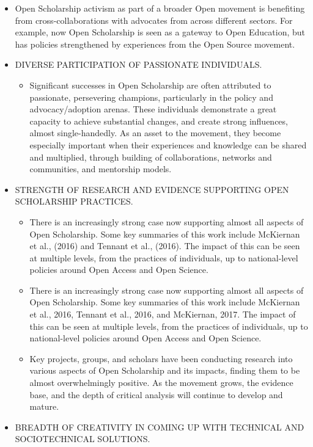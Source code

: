 \documentclass[]{article}
\providecommand{\tightlist}{%
  \setlength{\itemsep}{0pt}\setlength{\parskip}{0pt}}
\begin{document}
\begin{itemize}
\item
  Open Scholarship activism as part of a broader Open movement is
  benefiting from cross-collaborations with advocates from across
  different sectors. For example, now Open Scholarship is seen as a
  gateway to Open Education, but has policies strengthened by
  experiences from the Open Source movement.
\item
  DIVERSE PARTICIPATION OF PASSIONATE INDIVIDUALS.

  \begin{itemize}
  \tightlist
  \item
    Significant successes in Open Scholarship are often attributed to
    passionate, persevering champions, particularly in the policy and
    advocacy/adoption arenas. These individuals demonstrate a great
    capacity to achieve substantial changes, and create strong
    influences, almost single-handedly. As an asset to the movement,
    they become especially important when their experiences and
    knowledge can be shared and multiplied, through building of
    collaborations, networks and communities, and mentorship models.
  \end{itemize}
\item
  STRENGTH OF RESEARCH AND EVIDENCE SUPPORTING OPEN SCHOLARSHIP
  PRACTICES.

  \begin{itemize}
  \item
    There is an increasingly strong case now supporting almost all
    aspects of Open Scholarship. Some key summaries of this work include
    McKiernan et al., (2016) and Tennant et al., (2016). The impact of
    this can be seen at multiple levels, from the practices of
    individuals, up to national-level policies around Open Access and
    Open Science.
  \item
    There is an increasingly strong case now supporting almost all
    aspects of Open Scholarship. Some key summaries of this work include
    McKiernan et al., 2016, Tennant et al., 2016, and McKiernan, 2017.
    The impact of this can be seen at multiple levels, from the
    practices of individuals, up to national-level policies around Open
    Access and Open Science.
  \item
    Key projects, groups, and scholars have been conducting research
    into various aspects of Open Scholarship and its impacts, finding
    them to be almost overwhelmingly positive. As the movement grows,
    the evidence base, and the depth of critical analysis will continue
    to develop and mature.
  \end{itemize}
\item
  BREADTH OF CREATIVITY IN COMING UP WITH TECHNICAL AND SOCIOTECHNICAL
  SOLUTIONS.


\end{itemize}
\end{document}
